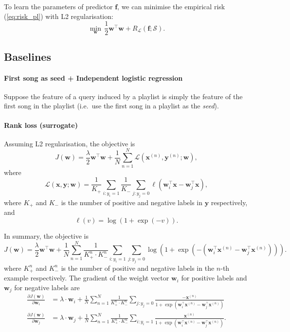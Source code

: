 \documentclass[9pt]{extarticle}
\newcommand{\f}{\mathbf{f}}
\newcommand{\x}{\mathbf{x}}
\newcommand{\y}{\mathbf{y}}
\newcommand{\1}{\mathbf{1}}
\newcommand{\w}{\mathbf{w}}
\newcommand{\LCal}{\mathcal{L}}
\newcommand{\SCal}{\mathcal{S}}
\newcommand{\pb}[1]{^{({#1})}}
\newcommand{\ie}{i.e.\ }
\begin{document}
To learn the parameters of predictor $\f$, we can minimise the empirical risk (\ref{eq:risk_pl}) with L2 regularisation:
\begin{equation}
\label{eq:minrisk_l2}
\min_{\w} \, \frac{1}{2} \w^\top \w + R_{\LCal}(\f; \SCal).
\end{equation}


\subsection{Baselines}

\paragraph{First song as seed +  Independent logistic regression}
Suppose the feature of a query induced by a playlist is simply the feature of the first song in the playlist 
(\ie use the first song in a playlist as the \emph{seed}).

\paragraph{Rank loss (surrogate)}
Assuming L2 regularisation, the objective is
\begin{equation*}
J(\w) = \frac{\lambda}{2}\w^\top \w + \frac{1}{N} \sum_{n=1}^N \LCal(\x\pb{n}, \y\pb{n}; \w),
\end{equation*}
where 
\begin{equation*}
\LCal(\x, \y; \w) = \frac{1}{K_+} \sum_{i: y_i = 1} \frac{1}{K_-} \sum_{j: y_j = 0} \ell(\w_i^\top \x - \w_j^\top \x),
\end{equation*}
where $K_+$ and $K_-$ is the number of positive and negative labels in $\y$ respectively,
and
\begin{equation*}
\ell(v) = \log(1 + \exp(-v)).
\end{equation*}

In summary, the objective is
\begin{equation}
\label{eq:obj_rank}
J(\w) = \frac{\lambda}{2} \w^\top \w + \frac{1}{N} \sum_{n=1}^N \frac{1}{K_+^n \cdot K_-^n} \sum_{i:y_i=1} \sum_{j:y_j=0} 
        \log(1 + \exp(-(\w_i^\top \x\pb{n} - \w_j^\top \x\pb{n}))).
\end{equation}
where $K_+^n$ and $K_-^n$ is the number of positive and negative labels in the $n$-th example respectively.
The gradient of the weight vector $\w_i$ for positive labels and $\w_j$ for negative labels are
\begin{align}
\frac{\partial J(\w)}{\partial \w_i} & = \lambda \cdot \w_i + \frac{1}{N} \sum_{n=1}^N \frac{1}{K_+^n \cdot K_-^n} \sum_{j:y_j=0} 
                                         \frac{-\x\pb{n}} {1 + \exp(\w_i^\top \x\pb{n} - \w_j^\top \x\pb{n})} \\
\frac{\partial J(\w)}{\partial \w_j} & = \lambda \cdot \w_j + \frac{1}{N} \sum_{n=1}^N \frac{1}{K_+^n \cdot K_-^n} \sum_{i:y_i=1} 
                                         \frac{\x\pb{n}} {1 + \exp(\w_i^\top \x\pb{n} - \w_j^\top \x\pb{n})}.
\end{align}
\end{document}
